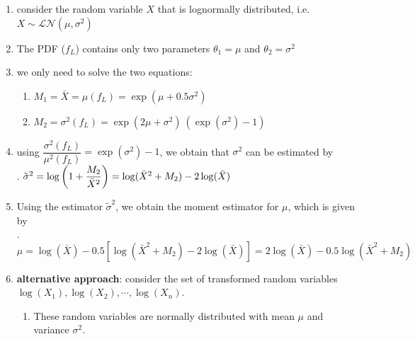 \begin{enumerate}
    \item consider the random variable $X$ that is lognormally distributed, i.e. $X \sim \mathcal{LN} (\mu ,\sigma ^{2})$
    \hfill \cite{statistics/book/Statistics-for-Data-Scientists/Maurits-Kaptein}

    \item The PDF ($f_L$) contains only two parameters $\theta_1 = \mu$ and $\theta_2 = \sigma^ 2 $
    \hfill \cite{statistics/book/Statistics-for-Data-Scientists/Maurits-Kaptein}

    \item we only need to solve the two equations:
    \hfill \cite{statistics/book/Statistics-for-Data-Scientists/Maurits-Kaptein}
    \begin{enumerate}
        \item $M_1 = \bar{X} = \mu  ( f_ L ) = \exp (\mu  + 0.5 \sigma  ^2)$
        \hfill \cite{statistics/book/Statistics-for-Data-Scientists/Maurits-Kaptein}

        \item $M_2 = \sigma  ^2 ( f _L ) = \exp (2\mu  + \sigma ^ 2)\ (\exp (\sigma  ^2) - 1)$
        \hfill \cite{statistics/book/Statistics-for-Data-Scientists/Maurits-Kaptein}
    \end{enumerate}

    \item using $\dfrac{\sigma ^2 ( f_ L )}{\mu^2 ( f_ L )} = \exp (\sigma^ 2) - 1$, we obtain that $\sigma^ 2$ can be estimated by
    \hfill \cite{statistics/book/Statistics-for-Data-Scientists/Maurits-Kaptein}
    \\
    .\hfill
    $
        \tilde{\sigma}^ 2 
        = \log \left( 1 + \dfrac{M_2} {\bar{X}^2} \right)
        = \log ( \bar{X}^2 + M_2 ) - 2 \log ( \bar{X} )
    $
    \hfill \cite{statistics/book/Statistics-for-Data-Scientists/Maurits-Kaptein}

    \item Using the estimator $\tilde{\sigma} ^2$, we obtain the moment estimator for $\mu$, which is given by
    \hfill \cite{statistics/book/Statistics-for-Data-Scientists/Maurits-Kaptein}
    \\[0.2cm]
    .\hfill
    $
        \mu 
        = \log ( \bar{X}) - 0.5 [\log ( \bar{X}^2 + M_2 ) - 2 \log ( \bar{X} )]
        = 2 \log ( \bar{X} ) - 0.5 \log ( \bar{X}^2 + M_2 ) 
    $
    \hfill \cite{statistics/book/Statistics-for-Data-Scientists/Maurits-Kaptein}

    \item \textbf{alternative approach}: consider the set of transformed random variables $\log (X_1), \log (X_2) , \cdots , \log (X _n )$.
    \hfill \cite{statistics/book/Statistics-for-Data-Scientists/Maurits-Kaptein}
    \begin{enumerate}
        \item These random variables are normally distributed with mean $\mu$ and variance $\sigma^ 2$. 
        \hfill \cite{statistics/book/Statistics-for-Data-Scientists/Maurits-Kaptein}


\end{enumerate}
\end{enumerate}
